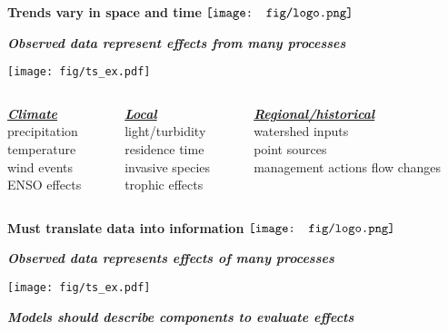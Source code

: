\documentclass{beamer}
\newcommand{\emtxt}[1]{\textbf{\textit{{\color{mypal4} #1}}}}
\begin{document}
\begin{frame}{\textbf{Trends vary in space and time} \hspace{0pt plus 1 filll} $\vcenter{\hbox{\texttt{[image: fig/logo.png]}}}$}
\centerline{\emtxt{Observed data represent effects from many processes}}
\vspace{0.15in}
\centerline{\texttt{[image: fig/ts\_ex.pdf]}}
\vspace{0.15in}
\begin{columns}[t]
\begin{column}{0.3\textwidth}
{\bf \underline{\emtxt{Climate}}}\\
precipitation\\
temperature\\
wind events\\
ENSO effects
\end{column}
\begin{column}{0.3\textwidth}
{\bf \underline{\emtxt{Local}}}\\
light/turbidity\\
residence time\\
invasive species\\
trophic effects
\end{column}
\begin{column}{0.3\textwidth}
{\bf \underline{\emtxt{Regional/historical}}}\\
watershed inputs\\
point sources\\
management actions
flow changes
\end{column}
\end{columns}
\end{frame}

\begin{frame}{\textbf{Must translate data into information} \hspace{0pt plus 1 filll} $\vcenter{\hbox{\texttt{[image: fig/logo.png]}}}$}
\onslide<+->
\centerline{\emtxt{Observed data represents effects of many processes}}
\vspace{0.15in}
\centerline{\texttt{[image: fig/ts\_ex.pdf]}}
\centerline{\emtxt{Models should describe components to evaluate effects}}
\vspace{-0.1in}
\begin{columns}[t]
\begin{column}{0.5\textwidth}
\end{column}
\begin{column}{0.5\textwidth}
\end{column}
\end{columns}
\end{frame}
\end{document}
